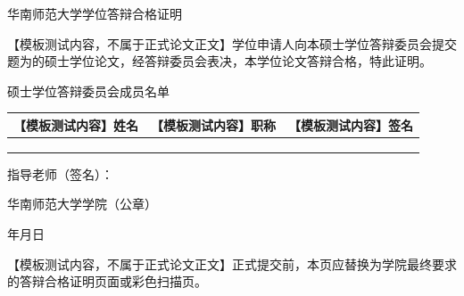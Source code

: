 \cleardoublepage
\thispagestyle{empty}

\begin{center}
  {\hei{} 华南师范大学学位答辩合格证明}
\end{center}

\vspace{1.2cm}

【模板测试内容，不属于正式论文正文】学位申请人\underline{\hspace{4cm}}向本硕士学位答辩委员会提交题为\underline{\hspace{7cm}}的硕士学位论文，经答辩委员会表决，本学位论文答辩合格，特此证明。

\vspace{1.0cm}

\begin{center}
  {\hei{} 硕士学位答辩委员会成员名单}
\end{center}

\vspace{0.5cm}

\begin{tabularx}{\textwidth}{|X|X|X|}
  \hline
  【模板测试内容】姓名 & 【模板测试内容】职称 & 【模板测试内容】签名 \\
  \hline
  & & \\
  \hline
  & & \\
  \hline
  & & \\
  \hline
\end{tabularx}

\vspace{1.2cm}

\noindent 指导老师（签名）：\underline{\hspace{5cm}}

\vspace{1.2cm}

\begin{flushright}
  华南师范大学\underline{\hspace{3cm}}学院（公章）

  \vspace{0.5cm}

  年\hspace{1.2cm}月\hspace{1.2cm}日
\end{flushright}

\vfill

【模板测试内容，不属于正式论文正文】正式提交前，本页应替换为学院最终要求的答辩合格证明页面或彩色扫描页。

\cleardoublepage
